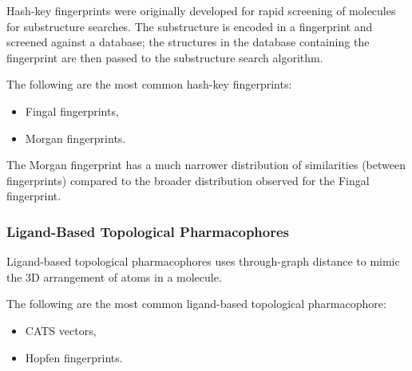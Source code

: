 Hash-key fingerprints were originally developed for rapid screening of molecules for substructure searches. The substructure is encoded in a fingerprint and screened against a database; the structures in the database containing the fingerprint are then passed to the substructure search algorithm.

The following are the most common hash-key fingerprints:
\begin{itemize}
    \item Fingal fingerprints,
    \item Morgan fingerprints.
\end{itemize}

The Morgan fingerprint has a much narrower distribution of similarities (between fingerprints) compared to the broader distribution observed for the Fingal fingerprint.

\subsubsection*{Ligand-Based Topological Pharmacophores}

Ligand-based topological pharmacophores uses through-graph distance to mimic the 3D arrangement of atoms in a molecule.

The following are the most common ligand-based topological pharmacophore:
\begin{itemize}
    \item CATS vectors,
    \item Hopfen fingerprints.
\end{itemize}